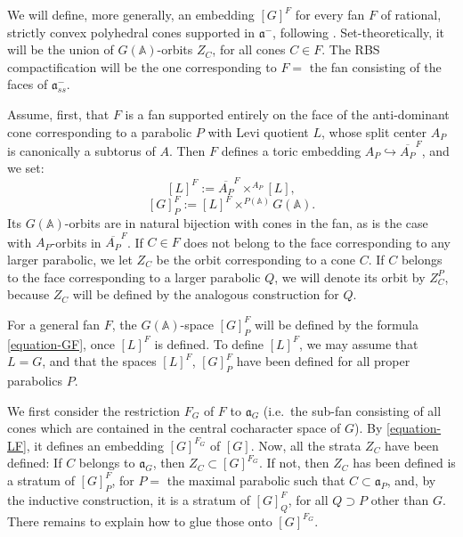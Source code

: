 We will define, more generally, an embedding $[G]^F$ for every fan $F$ of rational, strictly convex polyhedral cones supported in $\mathfrak a^-$, following \cite{Sakellaridis-stacks}. Set-theoretically, it will be the union of $G(\mathbb A)$-orbits $Z_C$, for all cones $C\in F$. The RBS compactification will be the one corresponding to $F=$ the fan consisting of the faces of $\mathfrak a^-_{ss}$. 

Assume, first, that $F$ is a fan supported entirely on the face of the anti-dominant cone corresponding to a parabolic $P$ with Levi quotient $L$, whose split center $A_P$ is canonically a subtorus of $A$. Then $F$ defines a toric embedding $A_P\hookrightarrow \overline{A_P}^F$, and we set:
\begin{equation}
\label{equation-LF} 
[L]^{F}:= \overline{A_P}^F\times^{A_P} [L],
\end{equation}
\begin{equation}
\label{equation-GF} 
[G]_P^{F}:= [L]^{F} \times^{P(\mathbb A)} G(\mathbb A).
\end{equation}
Its $G(\mathbb A)$-orbits are in natural bijection with cones in the fan, as is the case with $A_P$-orbits in $\overline{A_P}^F$. If $C\in F$ does not belong to the face corresponding to any larger parabolic,  we let $Z_C$ be the orbit corresponding to a cone $C$. If $C$ belongs to the face corresponding to a larger parabolic $Q$, we will denote its orbit by $Z_C^P$, because $Z_C$ will be defined by the analogous construction for $Q$.

For a general fan $F$, the $G(\mathbb A)$-space $[G]_P^{F}$ will be defined by the formula \eqref{equation-GF}, once $[L]^{F}$ is defined. To define $[L]^F$, we may assume that $L=G$, and that the spaces $[L]^{F}$, $[G]_P^{F}$ have been defined for all proper parabolics $P$.

We first consider the restriction $F_G$ of $F$ to $\mathfrak a_G$ (i.e.\ the sub-fan consisting of all cones which are contained in the central cocharacter space of $G$). By \eqref{equation-LF}, it defines an embedding $[G]^{F_G}$ of $[G]$. Now, all the strata $Z_C$ have been defined: If $C$ belongs to $\mathfrak a_G$, then $Z_C\subset [G]^{F_G}$. If not, then $Z_C$ has been defined is a stratum of $[G]_P^F$, for $P=$ the maximal parabolic such that $C\subset \mathfrak a_P$, and, by the inductive construction, it is a stratum of $[G]_Q^F$, for all $Q\supset P$ other than $G$. There remains to explain how to glue those onto $[G]^{F_G}$. 

